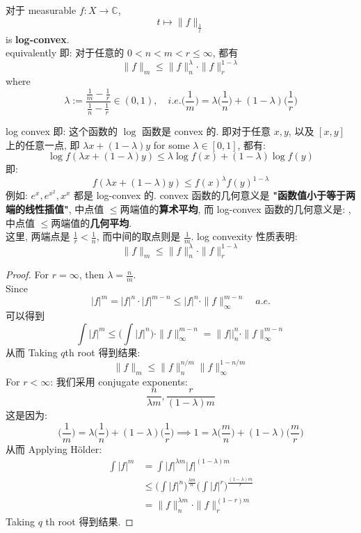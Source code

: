 \documentclass[lang=cn,11pt]{elegantbook}
\begin{document}
\begin{proposition}
对于 measurable $f: X \to \mathbb{C}$, \[
t \mapsto \| f\|_{\frac{1}{t}} 
\]is \textbf{log-convex}.\\
equivalently 即: 对于任意的 $0< n < m < r \leq \infty$, 都有 \[
\|f \|_m \leq \|f \|_n ^\lambda  \cdot \| f\|_r ^{1-\lambda}
\]
where \[
\lambda := \frac{\frac{1}{m} - \frac{1}{r}}{\frac{1}{n} - \frac{1}{r}} \in (0,1),\quad i.e. \bigg(\frac{1}{m}\bigg) = \lambda\bigg( \frac{1}{n}\bigg) + (1-\lambda) \bigg(\frac{1}{r}\bigg)
\]
\end{proposition}
\begin{remark}
    log convex 即: 这个函数的 $\log$ 函数是 convex 的. 即对于任意 $x,y$, 以及 $[x,y]$ 上的任意一点, 即 $\lambda x + (1-\lambda) y $ for some $\lambda \in [0,1]$, 都有: \[
    \log f (\lambda x + (1-\lambda) y) \leq \lambda  \log f(x) + (1-\lambda) \log f(y)
    \] 即: \[
    f (\lambda x + (1-\lambda) y)  \leq f(x)^\lambda f(y)^{1-\lambda}
    \]
例如: $e^x, e^{x^2}, x^x$ 都是 log-convex 的. convex 函数的几何意义是 \textbf{"函数值小于等于两端的线性插值"}, 中点值 $\leq $两端值的\textbf{算术平均}, 而 log-convex 函数的几何意义是: , 中点值 $\leq $两端值的\textbf{几何平均}.\\
这里, 两端点是 $\frac{1}{r} <\frac{1}{n}$, 而中间的取点则是 $\frac{1}{m}$. log convexity 性质表明: \[
\|f \|_m \leq \|f \|_n ^\lambda  \cdot \| f\|_r ^{1-\lambda}
\]
\end{remark}
\begin{proof}
    For $r = \infty$, then $\lambda = \frac{n}{m}$.\\
    Since \[
    |f |^m  =  |f |^n \cdot | f|^{m-n} \leq |f |^n \cdot \| f\|_\infty ^{m-n} \quad a.e.
    \]
    可以得到 \[
    \int |f |^m \leq \bigg(\int |f|^n \bigg) \cdot \|f \|_\infty ^{m-n}  =  \|f ||_n ^n \cdot  \|f \|_\infty ^{m-n}
    \]
    从而 Taking $q$th root 得到结果:\[
    \| f \|_m \leq \|f \|_n ^{n/m} \|f \|_\infty ^{1-n/m}
    \]
    For $r < \infty$: 我们采用 conjugate exponents: \[
    \frac{n}{\lambda m}, \frac{r}{(1-\lambda)m}
    \]
    这是因为:  \[
     \bigg(\frac{1}{m}\bigg) = \lambda\bigg( \frac{1}{n}\bigg) + (1-\lambda) \bigg(\frac{1}{r}\bigg) \implies 1 = \lambda\bigg( \frac{m}{n}\bigg) + (1-\lambda) \bigg(\frac{m}{r}\bigg)
    \]
    从而 Applying Hölder: \begin{align*}
         \int |f|^m &= \int |f|^{\lambda m  } |f|^{(1-\lambda)m}\\
         &\leq \bigg( \int {|f|^n}\bigg)^ {\frac{\lambda m}{n}} \bigg(\int |f|^r \bigg)^{\frac{(1-\lambda)m}{r}} \\
         & = \| f\|_n ^{\lambda m} \cdot \|f \|_r ^{(1-r) m}
    \end{align*}
    Taking $q$ th root 得到结果.
\end{proof}
\end{document}

